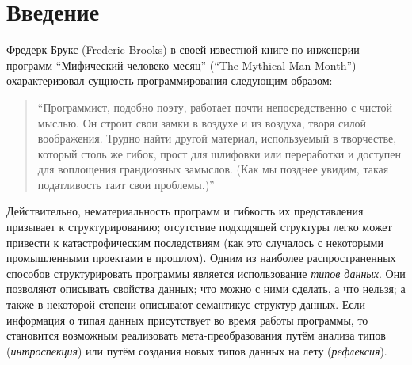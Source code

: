 \section{Введение}

Фредерк Брукс (Frederic Brooks) в своей известной книге по инженерии
программ  ``Мифический человеко-месяц'' (``The Mythical Man-Month'')~\cite{MMM} охарактеризовал сущность программирования следующим образом:

\blockquote{``Программист, подобно поэту, работает почти непосредственно с чистой мыслью. Он строит свои замки в воздухе и из воздуха, творя силой воображения. Трудно найти другой материал, используемый в творчестве, который столь же гибок, прост для шлифовки или переработки и доступен для воплощения грандиозных замыслов. (Как мы позднее увидим, такая податливость таит свои проблемы.)''}

Действительно, нематериальность программ и гибкость их представления  призывает к структурированию; отсутствие подходящей структуры легко может привести к катастрофическим последствиям
(как это случалось с некоторыми промышленными проектами в прошлом). Одним из наиболее распространенных способов структурировать программы является использование \emph{типов данных}. Они позволяют описывать свойства данных; что можно с ними сделать, а что нельзя; а также в некоторой степени описывают семантикус структур данных. Если информация о типая данных присутствует во время работы программы, то становится возможным реализовать мета-преобразования путём анализа типов (\emph{интроспекция}) или путём создания новых типов данных на лету (\emph{рефлексия}).

